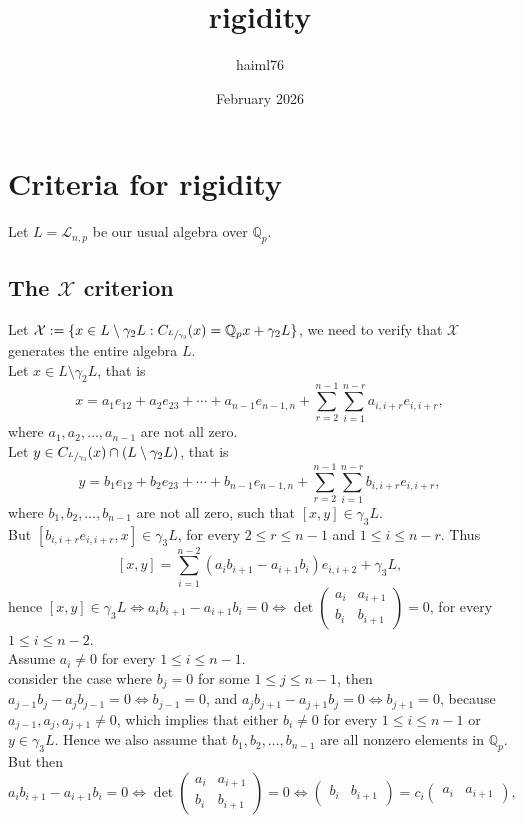 \documentclass{article}
\title{rigidity}
\author{haiml76 }
\date{February 2026}
\begin{document}
\maketitle

\section{Criteria for rigidity}
Let $L=\mathcal{L}_{n,p}$ be our usual algebra over $\mathbb{Q}_p$.\\
\subsection{The $\mathcal{X}$ criterion}
Let $\mathcal{X}:=\{x\in{L}\setminus\gamma_2L : C_{\sfrac{L}{\gamma_3}}(x)=\mathbb{Q}_px+\gamma_2L\}$, we need to verify that $\mathcal{X}$ generates the entire algebra $L$.\\
Let $x\in{L}\setminus\gamma_2{L}$, that is\\  \[x=a_1e_{12}+a_2e_{23}+\cdots+a_{n-1}e_{n-1,n}+\sum_{r=2}^{n-1}\sum_{i=1}^{n-r}a_{i,i+r}e_{i,i+r},\] 
where $a_1,a_2,\dots,a_{n-1}$ are not all zero.\\
Let $y\in{C}_{\sfrac{L}{\gamma_3}}(x)\cap\left(L\setminus\gamma_2L\right)$, that is 
\[y=b_1e_{12}+b_2e_{23}+\cdots+b_{n-1}e_{n-1,n}+\sum_{r=2}^{n-1}\sum_{i=1}^{n-r}b_{i,i+r}e_{i,i+r},\] 
where $b_1,b_2,\dots,b_{n-1}$ are not all zero, such that $[x,y]\in\gamma_3L$.\\
But $[b_{i,i+r}e_{i,i+r},x]\in\gamma_3L$, for every $2\leq{r}\leq{n-1}$ and $1\leq{i}\leq{n-r}$. Thus
\[
[x,y]=\sum_{i=1}^{n-2}\left(a_ib_{i+1}-a_{i+1}b_i\right)e_{i,i+2}+\gamma_3L
,\]
hence $[x,y]\in\gamma_3L\iff{a}_ib_{i+1}-a_{i+1}b_i=0\iff\det\begin{pmatrix}
a_i&a_{i+1}\\
b_i&b_{i+1}
\end{pmatrix}=0$, for every $1\leq{i}\leq{n-2}$.\\
Assume $a_i\neq{0}$ for every $1\leq{i}\leq{n-1}$.\\
consider the case where $b_j=0$ for some $1\leq{j}\leq{n-1}$, then\\ $a_{j-1}b_j-a_jb_{j-1}=0\iff{b}_{j-1}=0$, and $a_{j}b_{j+1}-a_{j+1}b_j=0\iff{b}_{j+1}=0$, because $a_{j-1},a_j,a_{j+1}\neq{0}$, which implies that either $b_i\neq{0}$ for every $1\leq{i}\leq{n-1}$ or $y\in\gamma_3L$. Hence we also assume that $b_1,b_2,\dots,b_{n-1}$ are all nonzero elements in $\mathbb{Q}_p$. But then\\
\[a_{i}b_{i+1}-a_{i+1}b_i=0\iff\det\begin{pmatrix}
a_i&a_{i+1}\\
b_i&b_{i+1}
\end{pmatrix}=0\iff\begin{pmatrix}
    b_i&b_{i+1}
\end{pmatrix}=c_i\begin{pmatrix}
    a_i&a_{i+1}
\end{pmatrix},\]
\end{document}
